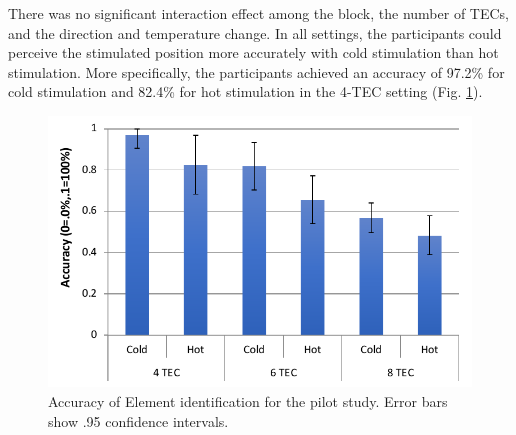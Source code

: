 \documentclass[preprint,12pt]{elsarticle}
\begin{document}
There was no significant interaction effect among the block, the number of TECs, and the direction and temperature change. In all settings, the participants could perceive the stimulated position more accurately with cold stimulation than hot stimulation. More specifically, the participants achieved an accuracy of 97.2\% for cold stimulation and 82.4\% for hot stimulation in the 4-TEC setting (Fig. \ref{fig:6}).



\begin{figure}[tp]
  \centering
  \includegraphics[width=0.7\columnwidth]{img/fig6.pdf}
  \caption{Accuracy of Element identification for the pilot study. Error bars show .95 confidence intervals.}
  \label{fig:6}
\end{figure}
\end{document}
